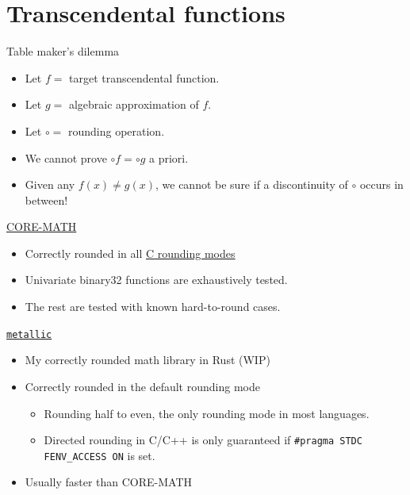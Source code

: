 \documentclass{beamer}
\begin{document}
\section{Transcendental functions}
\begin{frame}{Table maker's dilemma}
	\begin{itemize}
		\item Let $f =$ target transcendental function.
		\item Let $g =$ algebraic approximation of $f$.
		\item Let $\circ =$ rounding operation.
		\item We cannot prove $\circ f = \circ g$ a priori.
		\item Given any $f \left( x \right) \ne g \left( x \right)$, we cannot
		      be sure if a discontinuity of $\circ$ occurs in between!
	\end{itemize}
\end{frame}

\begin{frame}{\href{https://core-math.gitlabpages.inria.fr/}{CORE-MATH}}
	\begin{itemize}
		\item Correctly rounded in all \href{https://en.cppreference.com/w/c/numeric/fenv/FE_round}{C rounding modes}
		\item Univariate binary32 functions are exhaustively tested.
		\item The rest are tested with known hard-to-round cases.
	\end{itemize}
\end{frame}

\begin{frame}{\href{https://github.com/jdh8/metallic-rs}{\texttt{metallic}}}
	\begin{itemize}
		\item My correctly rounded math library in Rust (WIP)
		\item Correctly rounded in the default rounding mode
		      \begin{itemize}
			      \item Rounding half to even, the only rounding mode in most languages.
			      \item Directed rounding in C/C++ is only guaranteed if
			            \texttt{\#pragma STDC FENV\_ACCESS ON} is set.
		      \end{itemize}
		\item Usually faster than CORE-MATH
	\end{itemize}
\end{frame}
\end{document}
